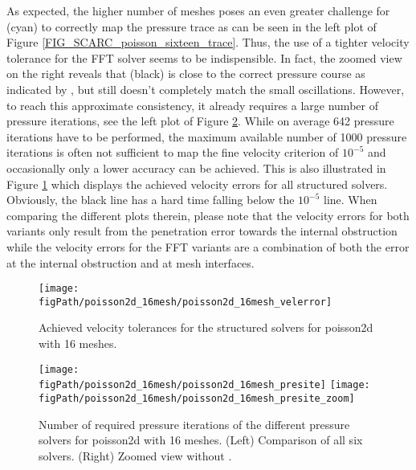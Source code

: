 As expected, the higher number of meshes poses an even greater challenge for \fftdefault{} (cyan) to correctly map the pressure trace as can be seen in the left plot of Figure \ref{FIG_SCARC_poisson_sixteen_trace}. Thus, the use of a tighter velocity tolerance for the FFT solver seems to be indispensible. In fact, the zoomed view on the right reveals that \ffttight{} (black) is close to the correct pressure course as indicated by \uglmat{}, but still doesn't completely match the small oscillations. However, to reach this approximate consistency, it already requires a large number of pressure iterations, see the left plot of Figure \ref{FIG_SCARC_poisson_sixteen_presite}. 
While  on average 642 pressure iterations have to be performed, the maximum available number of 1000 pressure iterations is often not sufficient to map the fine velocity criterion of $10^{-5}$ and occasionally only a lower accuracy can be achieved. This is also illustrated in Figure \ref{FIG_SCARC_poisson_sixteen_velerror} which displays the achieved velocity errors for all structured solvers. Obviously, the black  \ffttight{} line has a hard time falling below the $10^{-5}$ line.
When comparing the different plots therein, please note that the velocity errors for both \scarc{} variants only result from the penetration error towards the internal obstruction while the velocity errors for the FFT variants are a combination of both the error at the internal obstruction and at mesh interfaces.


\begin{figure}[ht]
\begin{center}
\texttt{[image: \\figPath/poisson2d\_16mesh/poisson2d\_16mesh\_velerror]}\\
\end{center}
\caption[Achieved velocity tolerances for the structured solvers in case of the 16-mesh poisson2d test case]{Achieved velocity tolerances for the structured solvers for {\ct poisson2d} with 16 meshes.}
\label{FIG_SCARC_poisson_sixteen_velerror}
\end{figure}

\begin{figure}[ht]
\begin{center}
\texttt{[image: \\figPath/poisson2d\_16mesh/poisson2d\_16mesh\_presite]}
\texttt{[image: \\figPath/poisson2d\_16mesh/poisson2d\_16mesh\_presite\_zoom]}
\end{center}
\caption[Number of required pressure iterations of the different pressure solvers for {\ct poisson2d} with 16 meshes]{Number of required pressure iterations of the different pressure solvers for {\ct poisson2d} with 16 meshes. (Left) Comparison of all six solvers. (Right) Zoomed view  without \ffttight{}.}
\label{FIG_SCARC_poisson_sixteen_presite}
\end{figure}

